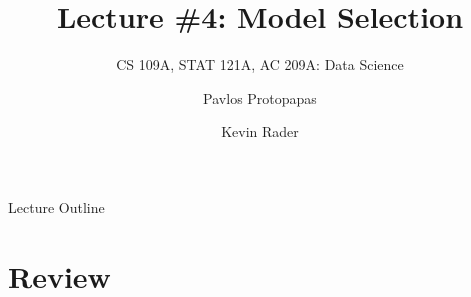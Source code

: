 \documentclass[12pt,t]{beamer}
\begin{document}

\title{\large{Lecture \#4: Model Selection}}
\subtitle{CS 109A, STAT 121A, AC 209A: Data Science}
\author{Pavlos Protopapas \and Kevin Rader}
\date{}
{
\frame{
  \titlepage
  
}
}


\begin{frame}{Lecture Outline}
\tableofcontents
\end{frame}

\section{Review}
\end{document}
